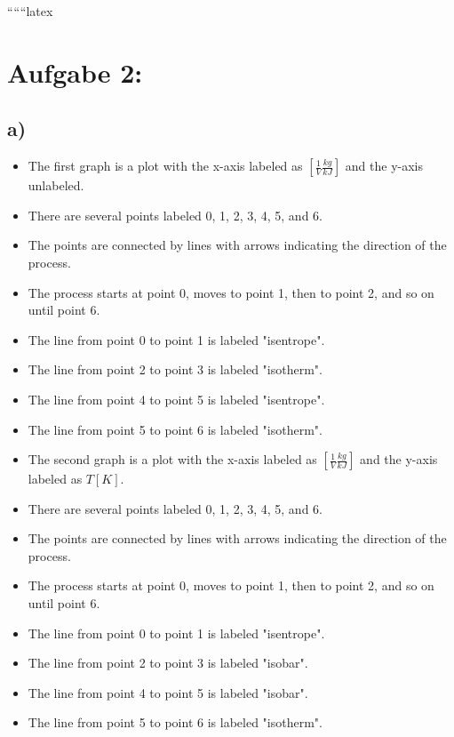 
``````latex


\section*{Aufgabe 2:}

\subsection*{a)}

\begin{itemize}
    \item The first graph is a plot with the x-axis labeled as $[ \frac{1}{V} \frac{kg}{kJ} ]$ and the y-axis unlabeled.
    \item There are several points labeled 0, 1, 2, 3, 4, 5, and 6.
    \item The points are connected by lines with arrows indicating the direction of the process.
    \item The process starts at point 0, moves to point 1, then to point 2, and so on until point 6.
    \item The line from point 0 to point 1 is labeled "isentrope".
    \item The line from point 2 to point 3 is labeled "isotherm".
    \item The line from point 4 to point 5 is labeled "isentrope".
    \item The line from point 5 to point 6 is labeled "isotherm".
\end{itemize}

\begin{itemize}
    \item The second graph is a plot with the x-axis labeled as $[ \frac{1}{V} \frac{kg}{kJ} ]$ and the y-axis labeled as $T [K]$.
    \item There are several points labeled 0, 1, 2, 3, 4, 5, and 6.
    \item The points are connected by lines with arrows indicating the direction of the process.
    \item The process starts at point 0, moves to point 1, then to point 2, and so on until point 6.
    \item The line from point 0 to point 1 is labeled "isentrope".
    \item The line from point 2 to point 3 is labeled "isobar".
    \item The line from point 4 to point 5 is labeled "isobar".
    \item The line from point 5 to point 6 is labeled "isotherm".
\end{itemize}

